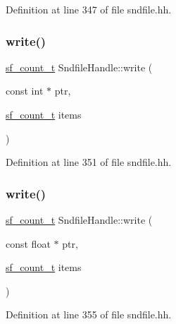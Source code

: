 Definition at line 347 of file sndfile.\+hh.

\mbox{\label{class_sndfile_handle_a6c787b63a36e8c432c38aad125444239}} 
\subsubsection{\texorpdfstring{write()}{write()}\hspace{0.1cm}{\footnotesize\ttfamily [2/4]}}
{\footnotesize\ttfamily \mbox{\hyperlink{sndfile_8h_af2b12fded74bc949f1f1f392a2af4892}{sf\+\_\+count\+\_\+t}} Sndfile\+Handle\+::write (\begin{DoxyParamCaption}\item[{const int $\ast$}]{ptr,  }\item[{\mbox{\hyperlink{sndfile_8h_af2b12fded74bc949f1f1f392a2af4892}{sf\+\_\+count\+\_\+t}}}]{items }\end{DoxyParamCaption})\hspace{0.3cm}{\ttfamily [inline]}}



Definition at line 351 of file sndfile.\+hh.

\mbox{\label{class_sndfile_handle_a25f654f209d8ef92c988be402384dbff}} 
\subsubsection{\texorpdfstring{write()}{write()}\hspace{0.1cm}{\footnotesize\ttfamily [3/4]}}
{\footnotesize\ttfamily \mbox{\hyperlink{sndfile_8h_af2b12fded74bc949f1f1f392a2af4892}{sf\+\_\+count\+\_\+t}} Sndfile\+Handle\+::write (\begin{DoxyParamCaption}\item[{const float $\ast$}]{ptr,  }\item[{\mbox{\hyperlink{sndfile_8h_af2b12fded74bc949f1f1f392a2af4892}{sf\+\_\+count\+\_\+t}}}]{items }\end{DoxyParamCaption})\hspace{0.3cm}{\ttfamily [inline]}}



Definition at line 355 of file sndfile.\+hh.

